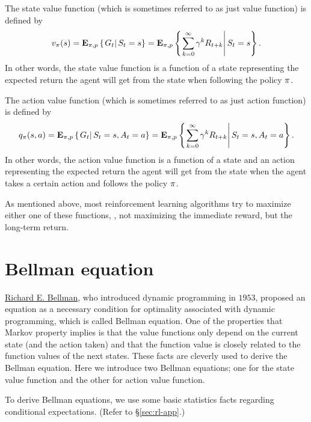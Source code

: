 The state value function (which is sometimes referred to as just value function) is defined by
\begin{equation}
v_{\pi}(s)
= \mathbf{E}_{\pi,p} \left\{\left.G_{t}\right|S_t = s\right\}
= \mathbf{E}_{\pi,p} \left\{\left.
    \sum_{k=0}^\infty \gamma^k R_{t+k}
    \right|S_t = s\right\}.
\end{equation}
In other words, the state value function is a function of a state
representing the expected return the agent will get from the state
when following the policy $\pi$.

The action value function (which is sometimes referred to as just action function) is defined by
\begin{equation}
q_{\pi}(s, a)
= \mathbf{E}_{\pi,p} \left\{\left.G_{t}\right|S_t = s, A_t = a\right\}
= \mathbf{E}_{\pi,p} \left\{\left.
    \sum_{k=0}^\infty \gamma^k R_{t+k}
    \right|S_t = s, A_t = a\right\}.
\end{equation}
In other words, the action value function is a function of a state and an action
representing the expected return the agent will get from the state when the agent takes a certain action
and follows the policy $\pi$.

As mentioned above, most reinforcement learning algorithms try to maximize either one of these functions,
\ie,
not maximizing the immediate reward, but the long-term return.

\newpage
\section{Bellman equation}

\href{https://en.wikipedia.org/wiki/Richard_E._Bellman}{Richard E. Bellman}, who introduced dynamic programming in $1953$,
proposed an equation as a necessary condition for optimality associated with dynamic programming,
which is called Bellman equation.
One of the properties that Markov property implies is that the value functions only depend on the current state (and the action taken)
and that the function value is closely related to the function values of the next states.
These facts are cleverly used to derive the Bellman equation.
Here we introduce two Bellman equations; one for the state value function and the other for action value function.

To derive Bellman equations, we use some basic statistics facts regarding conditional expectations.
(Refer to \S\ref{sec:rl-app}.)

